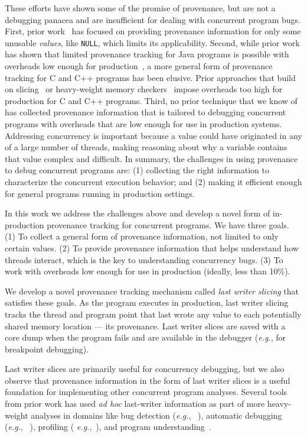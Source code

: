 \documentclass[preprint,9pt]{sigplanconf}
\begin{document}
These efforts have shown some of the promise of provenance, but are not a
debugging panacea and are insufficient for dealing with concurrent program
bugs. First, prior work~\cite{badapples} has focused on providing provenance
information for only some unusable {\em values}, like {\tt NULL}, which limits its applicability. 
Second, while prior work has shown that limited provenance tracking for Java
programs is possible with overheads low enough for production~\cite{badapples},
a more general form of provenance tracking for C and C++ programs has been
elusive. Prior approaches that build on slicing~\cite{thinslicing,
tipslicingsurvey, whylineicse} or heavy-weight memory checkers~\cite{badapples}
impose overheads too high for production for C and C++ programs. Third, no
prior technique that we know of has collected provenance information that is
tailored to debugging concurrent programs with overheads that are low enough
for use in production systems. Addressing concurrency is important because a
value could have originated in any of a large number of threads, making
reasoning about why a variable contains that value complex and difficult. In
summary, the challenges in using provenance to debug concurrent programs are:
(1) collecting the right information to characterize the concurrent execution
behavior; and (2) making it efficient enough for general programs running in
production settings. 

In this work we address the challenges above and develop a novel form of
in-production provenance tracking for concurrent programs. We have three
goals. (1) To collect a general form of provenance information, not limited to
only certain values. (2) To provide provenance information that helps
understand how threads interact, which is the key to understanding concurrency
bugs. (3) To work with overheads low enough for use in production (ideally,
less than 10\%).

We develop a novel provenance tracking mechanism called {\em last writer
slicing} that satisfies these goals.   As the program executes in production,
last writer slicing tracks the thread and program point that last wrote any
value to each potentially shared memory location --- its provenance.  Last
writer slices are saved with a core dump when the program fails and are
available in the debugger ({\em e.g.}, for breakpoint debugging).

Last writer slices are primarily useful for concurrency debugging, but we also
observe that provenance information in the form of last writer slices is a
useful foundation for implementing other concurrent program analyses.  Several
tools from prior work has used {\em ad hoc} last-writer information as part of
more heavy-weight analyses in domains like bug detection ({\em e.g.},
~\cite{dmtracker,avio}), automatic debugging ({\em e.g.},
~\cite{recon,conseq,cci}), profiling ({\em
e.g.},~\cite{threadclustering, schedpredictionmodel}), and program
understanding~\cite{oshatr}. 
\end{document}
